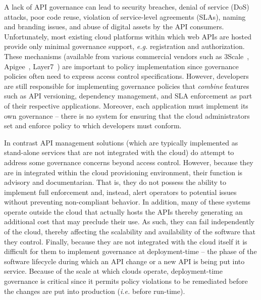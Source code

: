 A lack of API governance can lead to 
security breaches, denial of service (DoS)
attacks, poor code reuse, violation of service-level agreements (SLAs), 
naming and branding issues, and abuse of digital 
assets by the API consumers. Unfortunately, most existing cloud platforms
within which web APIs are hosted provide only minimal governance support, {\em
e.g.}
registration and authorization.  These mechanisms
(available from various commercial vendors such as
3Scale~\cite{3scale}, Apigee~\cite{apigee},
Layer7~\cite{layer7})
are important to policy implementation since governance policies often need to
express access control specifications.  
However, developers are still responsible for implementing governance policies
that {\em combine} features such as API versioning, 
dependency management, and SLA enforcement as part of their respective
applications.  Moreover, each application must
implement its own governance -- there is no system for ensuring that the
cloud administrators set and enforce policy to which developers must conform.

In contrast API management solutions (which are typically implemented as
stand-alone services that are not integrated with the cloud) do attempt to
address some governance concerns beyond access control.  However, because they
are in integrated within the cloud provisioning environment, their function is
advisory and documentarian.  That is, they 
do not possess the ability to implement full enforcement and, instead, alert
operators to potential issues without preventing non-compliant behavior.
In addition, many of these systems operate outside the 
cloud that actually hosts the APIs thereby generating an additional cost that
may preclude their use.
As such, they can fail independently of the cloud, thereby affecting 
the scalability and availability of the software that they control.
Finally, because they are not integrated with the cloud itself it is difficult
for them to
implement governance at deployment-time -- the phase of the software lifecycle
during which an API change or a new API is being put into service.
Because of the scale at which clouds operate, deployment-time governance is
critical since it permits policy violations to be remediated before the
changes are put into production ({\em i.e.} before run-time).

